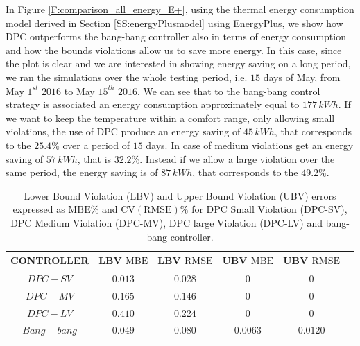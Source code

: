 In Figure \ref{F:comparison_all_energy_E+}, using the thermal energy consumption model derived in Section \ref{SS:energyPlusmodel} using EnergyPlus, we show how DPC outperforms the bang-bang controller also in terms of energy consumption and how the bounds violations allow us to save more energy. In this case, since the plot is clear and we are interested in showing energy saving on a long period, we ran the simulations over the whole testing period, i.e. $15$ days of May, from May $1^{st}$ $2016$ to May $15^{th}$ $2016$. We can see that to the bang-bang control strategy is associated an energy consumption approximately equal to $177\,kWh$. If we want to keep the temperature within a comfort range, only allowing small violations, the use of DPC produce an energy saving of $45\, kWh$, that corresponds to the $25.4\%$ over a period of $15$ days. In case of medium violations get an energy saving of $57\, kWh$, that is $32.2\%$. Instead if we allow a large violation over the same period, the energy saving is of $87\, kWh$, that corresponds to the $49.2\%$.
\begin{table}[t!]
	\centering
	\begin{tabular}{cccccc}
		\toprule
		CONTROLLER  & LBV $\mathrm{MBE}$  & LBV $\mathrm{RMSE}$ & UBV $\mathrm{MBE}$ & UBV $\mathrm{RMSE}$ 	\\ 
		\midrule
		$DPC-SV$    & $0.013$             & $0.028$  			      & $0$    				 & $0$     	  	\\
		$DPC-MV$    & $0.165$ 			  & $0.146$     			  & $0$    				 & $0$		  	\\
		$DPC-LV$    & $0.410$  			  & $0.224$     			  & $0$    				 & $0$	      	\\
		$Bang-bang$ & $0.049$ 			  & $0.080$    				  & $0.0063$ 		     & $0.0120$	  	\\
		\bottomrule
	\end{tabular}
	\caption{Lower Bound Violation (LBV) and Upper Bound Violation (UBV) errors expressed as $\mathrm{MBE}\%$ and $\mathrm{CV(RMSE)}\%$ for DPC Small Violation (DPC-SV), DPC Medium Violation (DPC-MV), DPC large Violation (DPC-LV) and bang-bang controller.}
	\captionsetup{justification=centering}
	\label{T:violationErrors}
\end{table}

